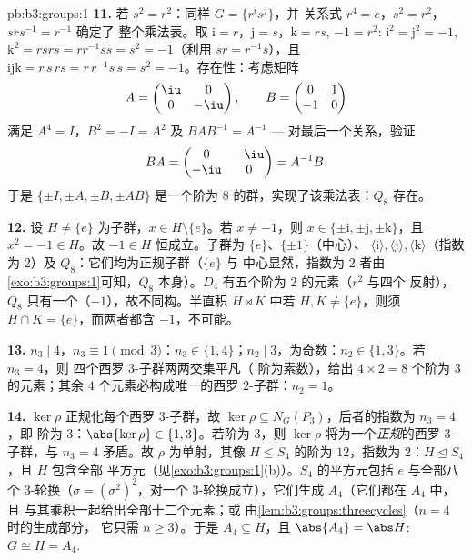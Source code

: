 \begin{solution}{pb:b3:groups:1}
\textbf{11.} 若 $s^2 = r^2$：同样 $G = \{r^i s^j\}$，并
关系式 $r^4 = e$，$s^2 = r^2$，$srs^{-1} = r^{-1}$ 确定了
整个乘法表。取 $\mathrm i = r$，$\mathrm j = s$，$\mathrm k =
rs$, $-1 = r^2$: $\mathrm i^2 = \mathrm j^2 = -1$, $\mathrm k^2 =
rsrs = r r^{-1} s s = s^2 = -1$（利用 $sr = r^{-1}s$），且
$\mathrm i \mathrm j \mathrm k = r\,s\,rs = r\,r^{-1}s\,s = s^2 =
-1$。存在性：考虑矩阵
\[
A = \begin{pmatrix} \iu & 0\\ 0 & -\iu \end{pmatrix},
\qquad
B = \begin{pmatrix} 0 & 1\\ -1 & 0 \end{pmatrix}
\]
满足 $A^4 = I$，$B^2 = -I = A^2$ 及 $BAB^{-1} = A^{-1}$ ---
对最后一个关系，验证
\[
BA = \begin{pmatrix} 0 & -\iu\\ -\iu & 0 \end{pmatrix} = A^{-1}B .
\]
于是 $\{\pm I, \pm A, \pm B, \pm AB\}$ 是一个阶为 $8$
的群，实现了该乘法表：$Q_8$ 存在。

\textbf{12.} 设 $H \neq \{e\}$ 为子群，$x \in H
\setminus \{e\}$。若 $x \neq -1$，则 $x \in \{\pm\mathrm i,
\pm\mathrm j, \pm\mathrm k\}$，且 $x^2 = -1 \in H$。故 $-1 \in H$
恒成立。子群为 $\{e\}$、$\{\pm 1\}$（中心）、
$\langle \mathrm i\rangle, \langle \mathrm j\rangle, \langle
\mathrm k\rangle$（指数为 $2$）及 $Q_8$：它们均为正规子群（$\{e\}$ 与
中心显然，指数为 $2$ 者由\cref{exo:b3:groups:1}可知，$Q_8$
本身）。$D_4$ 有五个阶为 $2$ 的元素（$r^2$ 与四个
反射），$Q_8$ 只有一个（$-1$），故不同构。半直积
$H \rtimes K$ 中若 $H, K \neq \{e\}$，则须 $H \cap K =
\{e\}$，而两者都含 $-1$，不可能。

\textbf{13.} $n_3 \mid 4$，$n_3 \equiv 1 \pmod 3$：$n_3 \in \{1,
4\}$；$n_2 \mid 3$，为奇数：$n_2 \in \{1, 3\}$。若 $n_3 = 4$，则
四个西罗 $3$-子群两两交集平凡（
阶为素数），给出 $4 \times 2 = 8$ 个阶为 $3$ 的元素；其余
$4$ 个元素必构成唯一的西罗
$2$-子群：$n_2 = 1$。

\textbf{14.} $\ker\rho$ 正规化每个西罗 $3$-子群，故
$\ker \rho \subseteq N_G(P_3)$，后者的指数为 $n_3 = 4$，即
阶为 $3$：$\abs{\ker\rho} \in \{1, 3\}$。若阶为 $3$，则
$\ker\rho$ 将为一个\emph{正规}的西罗 $3$-子群，与 $n_3
= 4$ 矛盾。故 $\rho$ 为单射，其像 $H \leq S_4$ 的阶为
$12$，指数为 $2$：$H \trianglelefteq S_4$，且 $H$ 包含全部
平方元（见\cref{exo:b3:groups:1}(b)）。$S_4$ 的平方元包括
$e$ 与全部八个 $3$-轮换（$\sigma = (\sigma^2)^2$，对一个
$3$-轮换成立），它们生成 $A_4$（它们都在 $A_4$ 中，且
与其乘积一起给出全部十二个元素；或
由\cref{lem:b3:groups:threecycles}（$n = 4$ 时的生成部分，
它只需 $n \geq 3$）。于是 $A_4 \subseteq H$，且 $\abs{A_4}
= \abs H$: $G \cong H = A_4$.


\end{solution}
